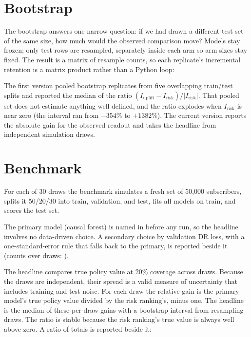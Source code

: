 \documentclass[11pt]{article}
\begin{document}
\section{Bootstrap}
\label{sec:bootstrap}
The bootstrap answers one narrow question: if we had drawn a different test set of the same size, how much would the observed comparison move? Models stay frozen; only test rows are resampled, separately inside each arm so arm sizes stay fixed.
The result is a matrix of resample counts, so each replicate's incremental retention is a matrix product rather than a Python loop:

\begin{warn}
The first version pooled bootstrap replicates from five overlapping train/test splits and reported the median of the ratio $(I_\text{uplift} - I_\text{risk})/|I_\text{risk}|$. That pooled set does not estimate anything well defined, and the ratio explodes when $I_\text{risk}$ is near zero (the interval ran from $-354\%$ to $+1382\%$). The current version reports the absolute gain for the observed readout and takes the headline from independent simulation draws.
\end{warn}

\section{Benchmark}
\label{sec:benchmark}
For each of 30 draws the benchmark simulates a fresh set of 50{,}000 subscribers, splits it 50/20/30 into train, validation, and test, fits all models on train, and scores the test set.


The primary model (causal forest) is named in  before any run, so the headline involves no data-driven choice. A secondary choice by validation DR loss, with a one-standard-error rule that falls back to the primary, is reported beside it (counts over draws: \RdrChoices).

The headline compares true policy value at 20\% coverage across draws. Because the draws are independent, their spread is a valid measure of uncertainty that includes training and test noise. For each draw the relative gain is the primary model's true policy value divided by the risk ranking's, minus one. The headline is the median of these per-draw gains with a bootstrap interval from resampling draws. The ratio is stable because the risk ranking's true value is always well above zero. A ratio of totals is reported beside it:
\end{document}
